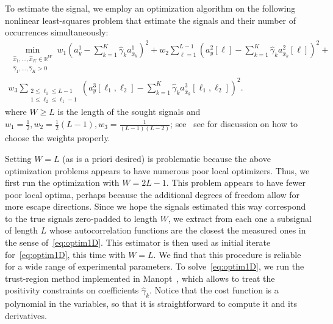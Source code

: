 \documentclass[english,11pt]{article}
\newcommand{\TODO}[1]{{\color{red}{[#1]}}}
\numberwithin{equation}{section}
\theoremstyle{plain}
\theoremstyle{definition}
\theoremstyle{remark}
\theoremstyle{plain}
\theoremstyle{remark}
\theoremstyle{plain}
\theoremstyle{plain}
\newcommand{\reals}{\mathbb{R}}
\begin{document}
To estimate the signal, we employ an optimization algorithm on the following nonlinear least-squares problem that estimate the signals and their number of occurrences simultaneously:
\begin{multline}
\min_{\substack{\hat x_1, \ldots, \hat x_K \in \reals^{W} \\ \hat \gamma_1, \ldots, \hat \gamma_K > 0}} w_1 \left( a_y^1 - \sum_{k=1}^K \hat \gamma_k a_{\hat x_k}^1 \right)^2 + w_2 \sum_{\ell = 1}^{L-1} \left( a_y^2[\ell] - \sum_{k=1}^K \hat \gamma_k a_{\hat x_k}^2[\ell] \right)^2 + \\ w_3 \sum_{\substack{2\leq\ell_1\leq L-1 \\ 1 \leq \ell_2 \leq \ell_1-1}} \left( a_y^3[\ell_1, \ell_2] - \sum_{k=1}^K \hat \gamma_k a_{\hat x_k}^3[\ell_1,\ell_2] \right)^2.
\label{eq:optim1D}
\end{multline}
where $W \geq L$ is the length of the sought signals and $w_1 = \frac{1}{2}, w_2 =\frac{1}{2}(L-1), w_3 = \frac{1}{(L-1)(L-2)}$; see~\cite{boumal2017heterogeneous} see for discussion on how to choose the weights properly.


 Setting $W = L$ (as is a priori desired) is problematic because the above optimization problems appears to have numerous poor local optimizers.
Thus, we first run the optimization with $W = 2L-1$. This problem appears to have fewer poor local optima, perhaps because the additional degrees of freedom allow for more escape directions. Since we hope the signals estimated this way correspond to the true signals zero-padded to length $W$, we extract from each one a subsignal of length $L$ whose autocorrelation functions are the closest the measured ones in the sense of~\eqref{eq:optim1D}. 
This estimator is then used as initial iterate for~\eqref{eq:optim1D}, this time with $W = L$. We find that this procedure is reliable for a wide range of experimental parameters. To solve~\eqref{eq:optim1D}, we run the trust-region method implemented in Manopt~\cite{manopt}, which allows to treat the positivity constraints \TODO{reference} on coefficients $\hat \gamma_k$. Notice that the cost function is a polynomial in the variables, so that it is straightforward to compute it and its derivatives.
\end{document}
